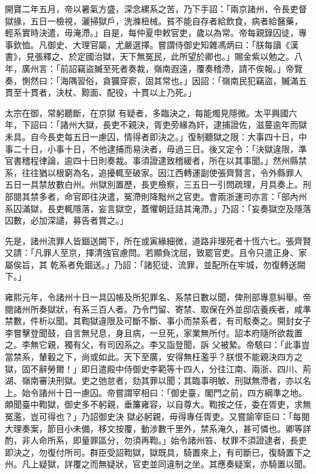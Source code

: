\begin{pinyinscope}
 開寶二年五月，帝以暑氣方盛，深念縲系之苦，乃下手詔：「兩京諸州，令長吏督獄掾，五日一檢視，灑掃獄戶，洗滌杻械。貧不能自存者給飲食，病者給醫藥，
 輕系實時決遣，毋淹滯。」自是，每仲夏申敕官吏，歲以為常。帝每親錄囚徒，專事欽恤。凡御史、大理官屬，尤嚴選擇。嘗謂侍御史知雜馮炳曰：「朕每讀《漢書》，見張釋之、於定國治獄，天下無冤民，此所望於卿也。」賜金紫以勉之。八年，廣州言：「前詔竊盜贓至死者奏裁，嶺南遐遠，覆奏稽滯，請不俟報。」帝覽奏，惻然曰：「海隅習俗，貪獷穿窬，固其常也。」因詔：「嶺南民犯竊盜，贓滿五貫至十貫者，決杖、黥面、配役，十貫以上乃死。」



 太宗在御，常躬聽斷，在京獄
 有疑者，多臨決之，每能燭見隱微。太平興國六年，下詔曰：「諸州大獄，長吏不親決，胥吏旁緣為奸，逮捕證佐，滋蔓逾年而獄未具。自今長吏每五日一慮囚，情得者即決之。」復制聽獄之限：大事四十日，中事二十日，小事十日，不他逮捕而易決者，毋過三日。後又定令：「決獄違限，準官書稽程律論，逾四十日則奏裁。事須證逮致稽緩者，所在以其事聞。」然州縣禁系，往往猶以根窮為名，追擾輒至破家。因江西轉運副使張齊賢言，令外縣罪人
 五日一具禁放數白州。州獄別置歷，長吏檢察，三五日一引問疏理，月具奏上。刑部閱其禁多者，命官即往決遣，冤滯則降黜州之官吏。會兩浙運司亦言：「部內州系囚滿獄，長吏輒隱落，妄言獄空，蓋懼朝廷詰其淹滯。」乃詔：「妄奏獄空及隱落囚數，必加深譴，募告者賞之。」



 先是，諸州流罪人皆錮送闕下，所在或寅緣細微，道路非理死者十恆六七。張齊賢又請：「凡罪人至京，擇清強官慮問。若顯負沈屈，致罷官吏。且令只遣正身、家屬俟旨，其
 乾系者免錮送。」乃詔：「諸犯徒、流罪，並配所在牢城，勿復轉送闕下。」



 雍熙元年，令諸州十日一具囚帳及所犯罪名、系禁日數以聞，俾刑部專意糾舉。帝閱諸州所奏獄狀，有系三百人者。乃令門留、寄禁、取保在外並邸店養疾者，咸準禁數，件析以聞。其鞫獄違限及可斷不斷、事小而禁系者，有司駁奏之。開封女子李嘗擊登聞鼓，自言無兒息，身且病，一旦死，家業無所付。詔本府隨所欲裁置之。李無它親，獨有父，有司因系之。李又詣登聞，訴
 父被縶。帝駭曰：「此事豈當禁系，輦轂之下，尚或如此。天下至廣，安得無枉濫乎？朕恨不能親決四方之獄，固不辭勞爾！」即日遣殿中侍御史李範等十四人，分往江南、兩浙、四川、荊湖、嶺南審決刑獄。吏之弛怠者，劾其罪以聞；其臨事明敏、刑獄無滯者，亦以名上。始令諸州十日一慮囚。帝嘗謂宰相曰：「御史臺，閣門之前，四方綱準之地。頗聞臺中鞫獄，御史多不躬親，垂簾雍容，以自尊大。鞫按之任，委在胥吏，求無冤濫，豈可得也？」乃詔御史決
 獄必躬親，毋得專任胥吏。又嘗諭宰臣曰：「每閱大理奏案，節目小未備，移文按覆，動涉數千里外，禁系淹久，甚可憐也。卿等詳酌，非人命所系，即量罪區分，勿須再鞫。」始令諸州笞、杖罪不須證逮者，長吏即決之，勿復付所司。群臣受詔鞫獄，獄既具，騎置來上，有司斷已，復騎置下之州。凡上疑獄，詳覆之而無疑狀，官吏並同違制之坐。其應奏疑案，亦騎置以聞。




\end{pinyinscope}
